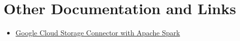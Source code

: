 \documentclass[english]{article}
\begin{document}
\section{Other Documentation and Links}
\begin{itemize}
\item \href{https://cloud.google.com/dataproc/docs/tutorials/gcs-connector-spark-tutorial}{Google Cloud Storage Connector with Apache Spark}
\end{itemize}
\end{document}

